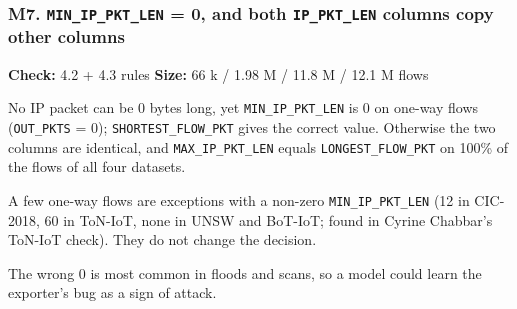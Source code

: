 \documentclass[10pt,a4paper]{article}
\newcommand{\meta}[2]{{\small\color{muted}\textbf{Check:} #1 \quad\textbar\quad \textbf{Size:} #2}}
\newenvironment{problem}{\par\noindent\begin{minipage}{\linewidth}\setlength{\parskip}{4pt}}{\end{minipage}\par\bigskip}
\begin{document}
\begin{problem}
\subsubsection*{M7. \texttt{MIN\_\allowbreak{}IP\_\allowbreak{}PKT\_\allowbreak{}LEN} = 0, and both \texttt{IP\_\allowbreak{}PKT\_\allowbreak{}LEN} columns copy other columns}
\meta{4.2 + 4.3 rules}{66 k / 1.98 M / 11.8 M / 12.1 M flows}

No IP packet can be 0 bytes long, yet \texttt{MIN\_\allowbreak{}IP\_\allowbreak{}PKT\_\allowbreak{}LEN} is 0 on one-way flows (\texttt{OUT\_\allowbreak{}PKTS} = 0); \texttt{SHORTEST\_\allowbreak{}FLOW\_\allowbreak{}PKT} gives the correct value. Otherwise the two columns are identical, and \texttt{MAX\_\allowbreak{}IP\_\allowbreak{}PKT\_\allowbreak{}LEN} equals \texttt{LONGEST\_\allowbreak{}FLOW\_\allowbreak{}PKT} on 100\% of the flows of all four datasets.

A few one-way flows are exceptions with a non-zero \texttt{MIN\_\allowbreak{}IP\_\allowbreak{}PKT\_\allowbreak{}LEN} (12 in CIC-2018, 60 in ToN-IoT, none in UNSW and BoT-IoT; found in Cyrine Chabbar's ToN-IoT check). They do not change the decision.

The wrong 0 is most common in floods and scans, so a model could learn the exporter's bug as a sign of attack.


\end{problem}
\end{document}

